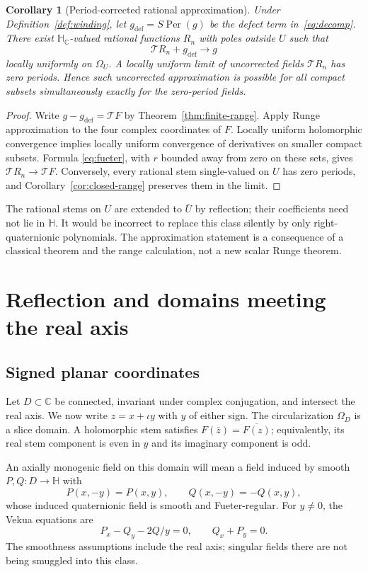 \documentclass[11pt,a4paper]{article}
\numberwithin{equation}{section}
\newtheorem{corollary}[theorem]{Corollary}
\theoremstyle{definition}
\theoremstyle{remark}
\newcommand{\C}{\mathbb C}
\newcommand{\HH}{\mathbb H}
\newcommand{\HC}{\mathbb H_{\C}}
\newcommand{\T}{\mathcal T}
\newcommand{\Per}{\operatorname{Per}}
\begin{document}
\begin{corollary}[Period-corrected rational approximation]\label{cor:runge}
Under Definition~\ref{def:winding}, let
$g_{\mathrm{def}}=S\Per(g)$ be the defect term in~\eqref{eq:decomp}.
There exist $\HC$-valued rational functions $R_n$ with poles outside
$U$ such that
\[
 \T R_n+g_{\mathrm{def}}\longrightarrow g
\]
locally uniformly on $\Omega_U$. A locally uniform limit of uncorrected
fields $\T R_n$ has zero periods. Hence such uncorrected approximation
is possible for all compact subsets simultaneously exactly for the
zero-period fields.
\end{corollary}
\begin{proof}
Write $g-g_{\mathrm{def}}=\T F$ by Theorem~\ref{thm:finite-range}.
Apply Runge approximation to the four complex coordinates of $F$.
Locally uniform holomorphic convergence implies locally uniform
convergence of derivatives on smaller compact subsets. Formula
\eqref{eq:fueter}, with $r$ bounded away from zero on these sets, gives
$\T R_n\to\T F$. Conversely, every rational stem single-valued on $U$
has zero periods, and Corollary~\ref{cor:closed-range} preserves them in
the limit.
\end{proof}
The rational stems on $U$ are extended to $\bar U$ by reflection;
their coefficients need not lie in $\HH$. It would be incorrect to
replace this class silently by only right-quaternionic polynomials.
The approximation statement is a consequence of a classical theorem
and the range calculation, not a new scalar Runge theorem.

\section{Reflection and domains meeting the real axis}
\label{sec:reflection}

\subsection{Signed planar coordinates}
Let $D\subset\C$ be connected, invariant under complex conjugation, and
intersect the real axis. We now write $z=x+\iota y$ with $y$ of either
sign. The circularization $\Omega_D$ is a slice domain. A holomorphic
stem satisfies $F(\bar z)=\overline{F(z)}$; equivalently, its real stem
component is even in $y$ and its imaginary component is odd.

An axially monogenic field on this domain will mean a field induced by
smooth $P,Q:D\to\HH$ with
\begin{equation}
 P(x,-y)=P(x,y),\qquad Q(x,-y)=-Q(x,y),
 \label{eq:parity}
\end{equation}
whose induced quaternionic field is smooth and Fueter-regular. For
$y\ne0$, the Vekua equations are
\[
 P_x-Q_y-2Q/y=0,\qquad Q_x+P_y=0.
\]
The smoothness assumptions include the real axis; singular fields there
are not being smuggled into this class.
\end{document}
